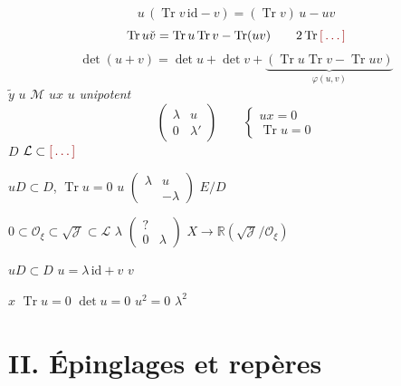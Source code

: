 \documentclass[11pt,a4paper]{article}
\begin{document}

\[
  u\,(\operatorname{Tr} v\,\mathrm{id} - v) = (\operatorname{Tr} v)\,u - uv
\]
\[
  \operatorname{Tr} u\check{v} = \operatorname{Tr} u \operatorname{Tr} v
  - \operatorname{Tr}(uv) \qquad 2 \operatorname{Tr} \ill{}
\]
\[
  \det(u + v) = \det u + \det v
  + \underbrace{(\operatorname{Tr} u \operatorname{Tr} v
  - \operatorname{Tr} uv)}_{\varphi(u, v)}
\]
 \ill{} $\tilde{y}$ \quad $u$ \quad $\mathcal{M}$ \quad
$u x$ \quad $u$ \emph{unipotent}
\[
  \begin{pmatrix} \lambda & u \\ 0 & \lambda' \end{pmatrix}
  \qquad
  \begin{cases} u x = 0 \\ \operatorname{Tr} u = 0 \end{cases}
\]
$D$ \ill{} \ill{} \ill{} \ill{} \ill{} \quad
$\mathcal{L} \subset \ill{}$ \ill{} \ill{} \ill{}

$u D \subset D$, $\operatorname{Tr} u = 0$ \quad $u$
$\begin{pmatrix} \lambda & u \\ & -\lambda \end{pmatrix}$ \quad $E/D$

 $0 \subset \mathcal{O}_\xi \subset \sqrt{\mathcal{J}} \subset
\mathcal{L}$ \quad $\lambda$ \quad
$\begin{pmatrix} ? & \\ 0 & \lambda \end{pmatrix}$ \quad
$X \to \mathbb{R}(\sqrt{\mathcal{J}}/\mathcal{O}_\xi)$

 $u D \subset D$ \qquad
{} $u = \lambda\,\mathrm{id} + v$ \quad $v$

 $x$ \quad $\operatorname{Tr} u = 0$ \struck{\ill{}}
$\det u = 0$ \quad $u^2 = 0$ \quad $\lambda^2$

\section{II. Épinglages et repères}
\end{document}
